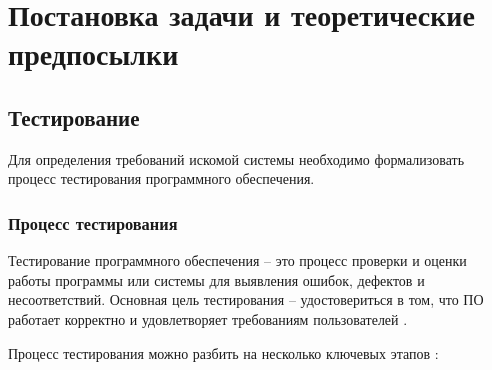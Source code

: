 \section{Постановка задачи и теоретические предпосылки}

\subsection{Тестирование}

Для определения требований искомой системы необходимо формализовать процесс тестирования программного обеспечения.

\subsubsection{Процесс тестирования}

Тестирование программного обеспечения --  это процесс проверки и оценки работы программы или системы для выявления ошибок, дефектов и несоответствий. Основная цель тестирования -- удостовериться в том, что ПО работает корректно и удовлетворяет требованиям пользователей \cite{software-testing}.

Процесс тестирования можно разбить на несколько ключевых этапов \cite{rex-black}:

